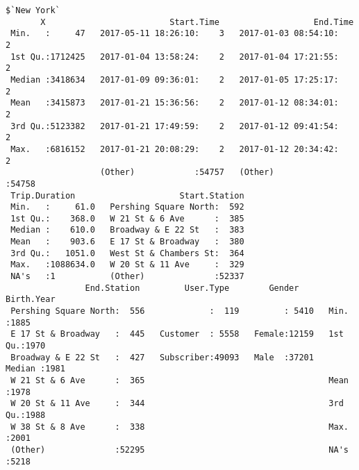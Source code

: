 \documentclass[11pt]{article}
\begin{document}
\begin{verbatim}
$`New York`
       X                         Start.Time                   End.Time    
 Min.   :     47   2017-05-11 18:26:10:    3   2017-01-03 08:54:10:    2  
 1st Qu.:1712425   2017-01-04 13:58:24:    2   2017-01-04 17:21:55:    2  
 Median :3418634   2017-01-09 09:36:01:    2   2017-01-05 17:25:17:    2  
 Mean   :3415873   2017-01-21 15:36:56:    2   2017-01-12 08:34:01:    2  
 3rd Qu.:5123382   2017-01-21 17:49:59:    2   2017-01-12 09:41:54:    2  
 Max.   :6816152   2017-01-21 20:08:29:    2   2017-01-12 20:34:42:    2  
                   (Other)            :54757   (Other)            :54758  
 Trip.Duration                     Start.Station  
 Min.   :     61.0   Pershing Square North:  592  
 1st Qu.:    368.0   W 21 St & 6 Ave      :  385  
 Median :    610.0   Broadway & E 22 St   :  383  
 Mean   :    903.6   E 17 St & Broadway   :  380  
 3rd Qu.:   1051.0   West St & Chambers St:  364  
 Max.   :1088634.0   W 20 St & 11 Ave     :  329  
 NA's   :1           (Other)              :52337  
                End.Station         User.Type        Gender        Birth.Year  
 Pershing Square North:  556             :  119         : 5410   Min.   :1885  
 E 17 St & Broadway   :  445   Customer  : 5558   Female:12159   1st Qu.:1970  
 Broadway & E 22 St   :  427   Subscriber:49093   Male  :37201   Median :1981  
 W 21 St & 6 Ave      :  365                                     Mean   :1978  
 W 20 St & 11 Ave     :  344                                     3rd Qu.:1988  
 W 38 St & 8 Ave      :  338                                     Max.   :2001  
 (Other)              :52295                                     NA's   :5218  


\end{verbatim}
\end{document}
